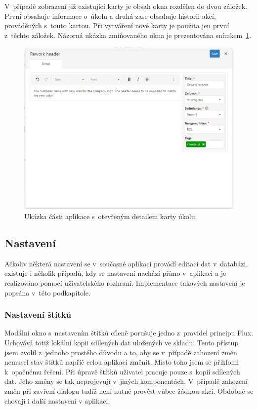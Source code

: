 V~případě zobrazení již existující karty je obsah okna rozdělen do dvou záložek. První obsahuje informace o~úkolu a druhá zase obsahuje historii akcí, prováděných s~touto kartou. Při vytváření nové karty je použita jen první z~těchto záložek. Názorná ukázka zmiňovaného okna je prezentována snímkem~\ref{img:card-detail}.

\begin{figure}[H]
	\centering
	\label{img:card-detail}
	\includegraphics[width=\textwidth]{obrazky-figures/card-detail.png}
	\caption{Ukázka části aplikace s~otevřeným detailem karty úkolu.}
\end{figure}


\subsection{Nastavení}
Ačkoliv některá nastavení se v~současné aplikaci provádí editací dat v~databázi, existuje i několik případů, kdy se nastavení nachází přímo v~aplikaci a je realizováno pomocí uživatelského rozhraní. Implementace takových nastavení je popsána v~této podkapitole.

\subsubsection*{Nastavení štítků}
Modální okno s~nastavením štítků cíleně porušuje jedno z~pravidel principu Flux. Uchovává totiž lokální kopii sdílených dat uložených ve skladu. Tento přístup jsem zvolil z~jednoho prostého důvodu a to, aby se v~případě zahození změn nemusel stav štítků napříč celou aplikací změnit. Místo toho jsem se přiklonil k~opačnému řešení. Při úpravě štítků uživatel pracuje pouze s~kopií sdílených dat. Jeho změny se tak neprojevují v~jiných komponentách. V~případě zahození změn při zavření dialogu tudíž není nutné provést vůbec žádnou akci. Obdobně se chovají i další nastavení v aplikaci.

